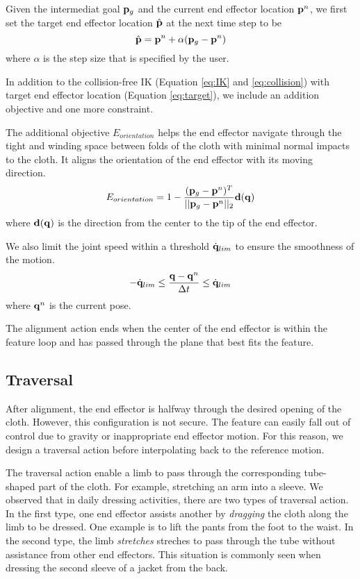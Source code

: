 Given the intermediat goal $\mathbf{p}_g$ and the current end effector location $\mathbf{p}^n$, we first set the target end effector location $\hat{\mathbf{p}}$ at the next time step to be 
\begin{equation}
  \hat{\mathbf{p}} = \mathbf{p}^n+\alpha(\mathbf{p}_g - \mathbf{p}^n)
  \label{eq:target}
\end{equation}
where $\alpha$ is the step size that is specified by the user.

In addition to the collision-free IK (Equation \ref{eq:IK} and \ref{eq:collision}) with target end effector location (Equation \ref{eq:target}), we include an addition objective and one more constraint.

The additional objective $E_{orientation}$ helps the end effector navigate through the tight and winding space between folds of the cloth with minimal normal impacts to the cloth. It aligns the orientation of the end effector with its moving direction.
\begin{displaymath}
E_{orientation} = 1-\frac{(\mathbf{p}_g-\mathbf{p}^n)^T}{||\mathbf{p}_g-\mathbf{p}^n||_2}\mathbf{d(q})
\end{displaymath}
where $\mathbf{d(q)}$ is the direction from the center to the tip of the end effector.

We also limit the joint speed within a threshold $\dot{\mathbf{q}}_{lim}$ to ensure the smoothness of the motion.
\begin{displaymath}
-\dot{\mathbf{q}}_{lim} \leq \frac{\mathbf{q} - \mathbf{q}^n}{\Delta t} \leq \dot{\mathbf{q}}_{lim}
\end{displaymath}
where $\mathbf{q}^n$ is the current pose.

The alignment action ends when the center of the end effector is within the feature loop and has passed through the plane that best fits the feature.

\subsection{Traversal}
After alignment, the end effector is halfway through the desired opening of the cloth. However, this configuration is not secure. The feature can easily fall out of control due to gravity or inappropriate end effector motion. For this reason, we design a traversal action before interpolating back to the reference motion.

The traversal action enable a limb to pass through the corresponding tube-shaped part of the cloth. For example, stretching an arm into a sleeve. We observed that in daily dressing activities, there are two types of traversal action. In the first type, one end effector assists another by \emph{dragging} the cloth along the limb to be dressed. One example is to lift the pants from the foot to the waist. In the second type, the limb \emph{stretches} streches to pass through the tube without assistance from other end effectors. This situation is commonly seen when dressing the second sleeve of a jacket from the back.

